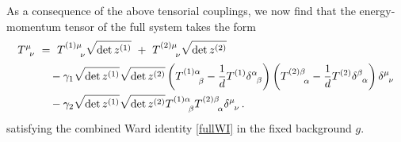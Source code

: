 \documentclass[prd,reprint,a4paper,showpacs,superscriptaddress,11pt,onecolumn,nofootinbib]{revtex4-1}
\renewcommand{\(}{\left(}
\renewcommand{\)}{\right)}
\newcommand{\6}{\partial}
\begin{document}
As a consequence of the above tensorial couplings, we now find that the energy-momentum tensor of the full system takes the form
\begin{align}
T^\mu_{\phantom{\mu}\nu} ~ &= ~ T^{(1)\mu}_{\phantom{(1)\mu}\nu}\sqrt{{\rm det}\, z^{(1)}} ~ + ~ T^{(2)\mu}_{\phantom{(1)\mu}\nu}\sqrt{{\rm det}\, z^{(2)}}\nonumber\\ 
&\quad - \gamma_1\sqrt{{\rm det}\, z^{(1)}}\sqrt{{\rm det}\, z^{(2)}} \left(T^{(1)\alpha}_{\phantom{(2)\mu}\beta}- \dfrac{1}{d} T^{(1)} \delta^\alpha_{\phantom{\mu}\beta}\right)\left(T^{(2)\beta}_{\phantom{(2)\mu}\alpha}- \dfrac{1}{d} T^{(2)} \delta^\beta_{\phantom{\mu}\alpha}\right)\delta^\mu_{\phantom{\mu}\nu} \label{eqn:totaltensortmunu} \nonumber \\
&\quad -\gamma_2\sqrt{{\rm det}\, z^{(1)}}\sqrt{{\rm det}\, z^{(2)}}T^{(1)\alpha}_{\phantom{(2)\mu}\beta}T^{(2)\beta}_{\phantom{(2)\mu}\alpha}\delta^\mu_{\phantom{\mu}\nu}\,  .
\end{align}
satisfying the combined Ward identity \eqref{fullWI} in the fixed background $g$.
\end{document}
